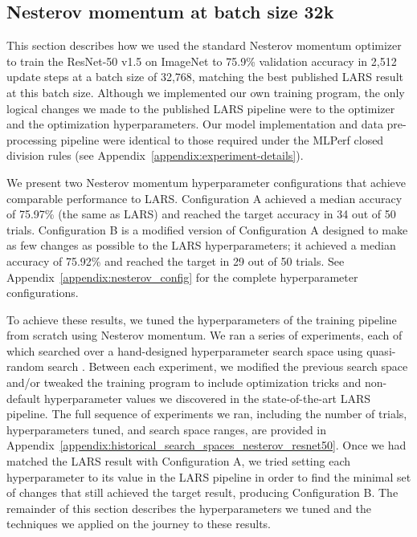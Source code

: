\documentclass{article}
\begin{document}
\subsection{Nesterov momentum at batch size 32k}

This section describes how we used the standard Nesterov momentum optimizer to train the ResNet-50 v1.5 on ImageNet to 75.9\% validation accuracy in 2,512 update steps at a batch size of 32,768, matching the best published LARS result at this batch size. Although we implemented our own training program, the only logical changes we made to the published LARS pipeline were to the optimizer and the optimization hyperparameters. Our model implementation and data pre-processing pipeline were identical to those required under the MLPerf closed division rules (see Appendix~\ref{appendix:experiment-details}).

We present two Nesterov momentum hyperparameter configurations that achieve comparable performance to LARS. Configuration A achieved a median accuracy of 75.97\% (the same as LARS) and reached the target accuracy in 34 out of 50 trials. Configuration B is a modified version of Configuration A designed to make as few changes as possible to the LARS hyperparameters; it achieved a median accuracy of 75.92\% and reached the target in 29 out of 50 trials. 
See Appendix~\ref{appendix:nesterov_config} for the complete hyperparameter configurations.

To achieve these results, we tuned the hyperparameters of the training pipeline from scratch using Nesterov momentum. We ran a series of experiments, each of which searched over a hand-designed hyperparameter search space using quasi-random search \citep{bousquet2017critical}. Between each experiment, we modified the previous search space and/or tweaked the training program to include optimization tricks and non-default hyperparameter values we discovered in the state-of-the-art LARS pipeline. The full sequence of experiments we ran, including the number of trials, hyperparameters tuned, and search space ranges, are provided in Appendix~\ref{appendix:historical_search_spaces_nesterov_resnet50}. Once we had matched the LARS result with Configuration A, we tried setting each hyperparameter to its value in the LARS pipeline in order to find the minimal set of changes that still achieved the target result, producing Configuration B. The remainder of this section describes the hyperparameters we tuned and the techniques we applied on the journey to these results.
\end{document}
